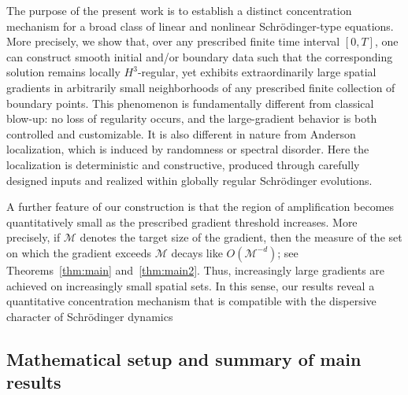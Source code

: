 \documentclass[11pt,reqno,oneside]{amsart}
\numberwithin{equation}{section}
\theoremstyle{definition}
\theoremstyle{remark}
\numberwithin{equation}{section}
\begin{document}
The purpose of the present work is to establish a distinct concentration mechanism for a broad class of linear and nonlinear Schr\"odinger-type equations. More precisely, we show that, over any prescribed finite time interval $[0,T]$, one can construct smooth initial and/or boundary data such that the corresponding solution remains locally $H^{3}$-regular, yet exhibits extraordinarily large spatial gradients in arbitrarily small neighborhoods of any prescribed finite collection of boundary points. This phenomenon is fundamentally different from classical blow-up: no loss of regularity occurs, and the large-gradient behavior is both controlled and customizable. It is also different in nature from Anderson localization, which is induced by randomness or spectral disorder. Here the localization is deterministic and constructive, produced through carefully designed inputs and realized within globally regular Schr\"odinger evolutions.

A further feature of our construction is that the region of amplification becomes quantitatively small as the prescribed gradient threshold increases. More precisely, if $\mathcal M$ denotes the target size of the gradient, then the measure of the set on which the gradient exceeds $\mathcal M$ decays like $O(\mathcal M^{-d})$; see Theorems~\ref{thm:main} and~\ref{thm:main2}. Thus, increasingly large gradients are achieved on increasingly small spatial sets. In this sense, our results reveal a quantitative concentration mechanism that is compatible with the dispersive character of Schr\"odinger dynamics

	

	
	\subsection{Mathematical setup and summary of main results}
\end{document}
